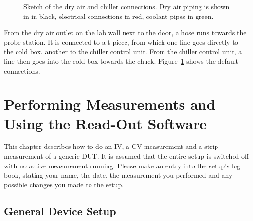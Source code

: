 \documentclass[a4paper]{article}
\begin{document}
\begin{figure}[hbtp!]
\caption[Dry Air and Chiller Connections]{Sketch of the dry air and chiller connections. Dry air piping is shown in in black, electrical connections in red, coolant pipes in green.}
\label{fig:dryair}
\end{figure}

From the dry air outlet on the lab wall next to the door, a hose runs towards the probe station.
It is connected to a t-piece, from which one line goes directly to the cold box, another to the chiller control unit.
From the chiller control unit, a line then goes into the cold box towards the chuck.
Figure~\ref{fig:dryair} shows the default connections.\\

\afterpage{\null\newpage} %
\newpage

\section{Performing Measurements and Using the Read-Out Software}
\label{sec:meas}

This chapter describes how to do an IV, a CV measurement and a strip measurement of a generic DUT.
It is assumed that the entire setup is switched off with no active measurement running.
Please make an entry into the setup's log book, stating your name, the date, the measurement you performed and any possible changes you made to the setup.\\

\subsection{General Device Setup}
\label{sec:devicesetup}
\end{document}

